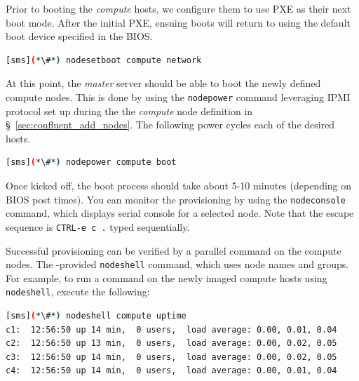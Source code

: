 Prior to booting the {\em compute} hosts, we configure them to use PXE as their
next boot mode. After the initial PXE, ensuing boots will return to using the default boot device
specified in the BIOS.

\begin{lstlisting}[language=bash,keywords={},upquote=true]
[sms](*\#*) nodesetboot compute network
\end{lstlisting}

At this point, the {\em master} server should be able to boot the newly defined
compute nodes. This is done by using the \texttt{nodepower} \Confluent{} command
leveraging IPMI protocol set up during the the {\em compute} node definition
in \S~\ref{sec:confluent_add_nodes}. The following power cycles each of the
desired hosts.


\begin{lstlisting}[language=bash,keywords={},upquote=true]
[sms](*\#*) nodepower compute boot
\end{lstlisting}

Once kicked off, the boot process should take about 5-10
minutes (depending on BIOS post times).  You can monitor the
provisioning by using the \texttt{nodeconsole} command, which displays serial console
for a selected node. Note that the escape sequence
is \texttt{CTRL-e c .} typed sequentially.

Successful provisioning can be verified by a parallel command on the compute
nodes. The \Confluent{}-provided
\texttt{nodeshell} command, which uses \Confluent{} node names and groups.
For example, to run a command on
the newly imaged compute hosts using \texttt{nodeshell}, execute the following:

\begin{lstlisting}[language=bash]
[sms](*\#*) nodeshell compute uptime
c1:  12:56:50 up 14 min,  0 users,  load average: 0.00, 0.01, 0.04
c2:  12:56:50 up 13 min,  0 users,  load average: 0.00, 0.02, 0.05
c3:  12:56:50 up 14 min,  0 users,  load average: 0.00, 0.02, 0.05
c4:  12:56:50 up 14 min,  0 users,  load average: 0.00, 0.01, 0.04
\end{lstlisting}
